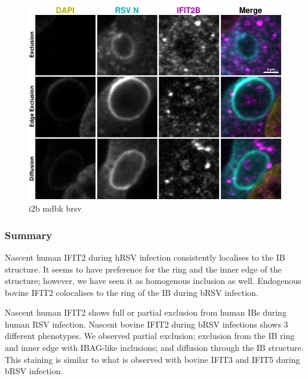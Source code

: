\begin{figure}
    \centering
    \includegraphics[width=1\linewidth]{10. Chapter 5/Figs/01. Infection/09. i2b mdbk brsv.pdf}
    \caption[i2b mdbk brsv]{i2b mdbk brsv}
    \label{fig:i2b mdbk brsv}
\end{figure}

\subsubsection{Summary} \label{Summary-i2-infection}
Nascent human IFIT2 during hRSV infection consistently localises to the IB structure. It seems to have preference for the ring and the inner edge of the structure; however, we have seen it as homogenous inclusion as well. Endogenous bovine IFIT2 colocalises to the ring of the IB during bRSV infection.

Nascent human IFIT2 shows full or partial exclusion from human IBs during human RSV infection. Nascent bovine IFIT2 during bRSV infections shows 3 different phenotypes. We observed partial exclusion; exclusion from the IB ring and inner edge with IBAG-like inclusions; and diffusion through the IB structure. This staining is similar to what is observed with bovine IFIT3 and IFIT5 during bRSV infection.